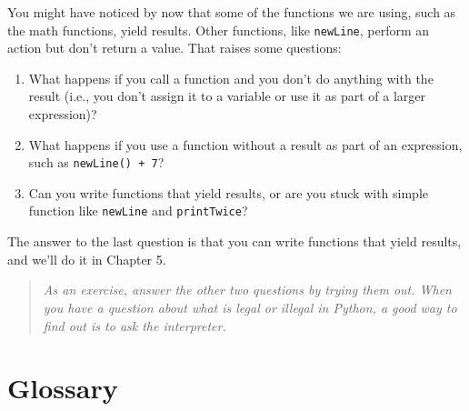 You might have noticed by now that some of the functions we are using,
such as the math functions, yield results.  Other functions, like
{\tt newLine}, perform an action but don't return a value.  That raises
some questions:

\begin{enumerate}

\item What happens if you call a function and you don't do anything
with the result (i.e., you don't assign it to a variable or use it as
part of a larger expression)?

\item What happens if you use a function without a result as part of
an expression, such as {\tt newLine() + 7}?

\item Can you write functions that yield results, or are you stuck with
simple function like {\tt newLine} and {\tt printTwice}?

\end{enumerate}

The answer to the last question is that you can write functions that
yield results, and we'll do it in Chapter 5.

\begin{quote}
{\em As an exercise, answer the other two questions by trying them
out.  When you have a question about what is legal or illegal in
Python, a good way to find out is to ask the interpreter.}
\end{quote}


\section{Glossary}

